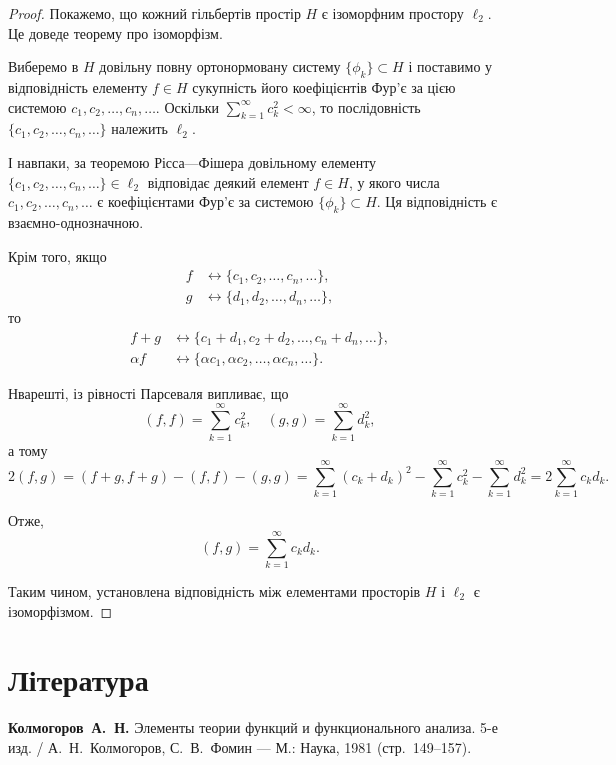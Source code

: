 \begin{proof}
Покажемо, що кожний гільбертів простір
$H$ є ізоморфним простору $\ell_2$.
Це доведе теорему про ізоморфізм.

Виберемо в $H$ довільну повну ортонормовану систему
$\{\phi_k\} \subset H$ і поставимо у відповідність елементу $f \in H$
сукупність його коефіцієнтів Фур’є за цією системою
$c_1, c_2, \dots, c_n, \dots$. Оскільки
$\sum_{k = 1}^\infty c_k^2 < \infty$, то послідовність
$\{c_1, c_2, \dots, c_n, \dots\}$ належить $\ell_2$.

І навпаки, за теоремою Рісса---Фішера довільному елементу
$\{c_1, c_2, \dots, c_n, \dots\} \in \ell_2$
відповідає деякий елемент $f \in H$, у якого числа
$c_1, c_2, \dots, c_n, \dots$ є коефіцієнтами Фур’є за системою
$\{\phi_k\} \subset H$. Ця відповідність є взаємно-однозначною.

Крім того, якщо
\begin{align*}
    f &\leftrightarrow \{c_1, c_2, \dots, c_n, \dots\}, \\
    g &\leftrightarrow \{d_1, d_2, \dots, d_n, \dots\},
\end{align*}
то
\begin{align*}
    f + g &\leftrightarrow \{c_ 1 + d_1, c_2 + d_2, \dots, c_n + d_n, \dots\}, \\
    \alpha f &\leftrightarrow \{\alpha c_1, \alpha c_2, \dots, \alpha c_n, \dots\}.
\end{align*}

Нварешті, із рівності Парсеваля випливає, що
\begin{equation*}
    (f, f) = \sum_{k = 1}^\infty c_k^2, \quad
    (g, g) = \sum_{k = 1}^\infty d_k^2,
\end{equation*}
а тому
\begin{equation*}
    2 (f, g) = (f + g, f + g) - (f, f) - (g, g) =
    \sum_{k = 1}^\infty (c_k + d_k)^2 -
    \sum_{k = 1}^\infty c_k^2 -
    \sum_{k = 1}^\infty d_k^2 =
    2 \sum_{k = 1}^\infty c_k d_k.
\end{equation*}

Отже,
\begin{equation*}
    (f, g) = \sum_{k = 1}^\infty c_k d_k.
\end{equation*}

Таким чином, установлена відповідність між елементами
просторів $H$ і $\ell_2$ є ізоморфізмом. 
\end{proof}

\section{Література}

\begin{enumerate}[label={[\arabic*]}]
\item \textbf{Колмогоров~А.~Н.}
Элементы теории функций и функционального анализа. 5-е изд. /
А.~Н.~Колмогоров, С.~В.~Фомин ---
М.: Наука, 1981 (стр.~149--157).
\end{enumerate}
